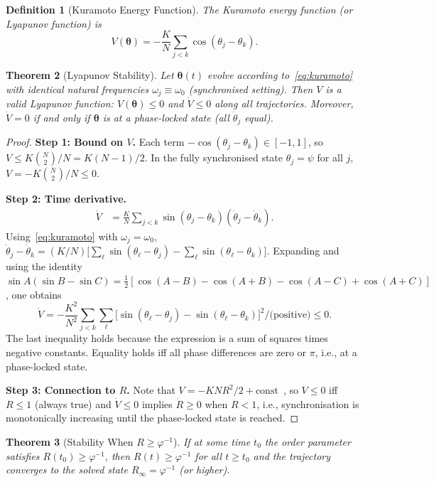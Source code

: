 \documentclass[12pt]{article}
\newtheorem{theorem}{Theorem}
\newtheorem{definition}[theorem]{Definition}
\newcommand{\PHIINV}{\varphi^{-1}}
\newcommand{\thetavec}{\boldsymbol{\theta}}
\begin{document}
\begin{definition}[Kuramoto Energy Function]
\label{def:energy}
The \emph{Kuramoto energy function} (or Lyapunov function) is
\[
  V(\thetavec) = -\frac{K}{N}\sum_{j < k}\cos(\theta_j - \theta_k).
\]
\end{definition}

\begin{theorem}[Lyapunov Stability]
\label{thm:lyapunov}
Let $\thetavec(t)$ evolve according to~\eqref{eq:kuramoto} with identical natural
frequencies $\omega_j \equiv \omega_0$ (synchronised setting).  Then $V$ is a
valid Lyapunov function: $V(\thetavec) \le 0$ and $\dot{V} \le 0$ along all
trajectories.  Moreover, $\dot{V} = 0$ if and only if $\thetavec$ is at a
phase-locked state (all $\dot{\theta}_j$ equal).
\end{theorem}

\begin{proof}
\textbf{Step 1: Bound on $V$.}  Each term $-\cos(\theta_j - \theta_k) \in
[-1, 1]$, so $V \le K\binom{N}{2}/N = K(N-1)/2$.  In the fully synchronised
state $\theta_j = \psi$ for all $j$, $V = -K\binom{N}{2}/N \le 0$.

\textbf{Step 2: Time derivative.}
\begin{align*}
  \dot{V} &= \frac{K}{N}\sum_{j < k}\sin(\theta_j - \theta_k)
             (\dot{\theta}_j - \dot{\theta}_k).
\end{align*}
Using~\eqref{eq:kuramoto} with $\omega_j = \omega_0$,
$\dot{\theta}_j - \dot{\theta}_k = (K/N)\bigl[\sum_\ell\sin(\theta_\ell -
\theta_j) - \sum_\ell\sin(\theta_\ell - \theta_k)\bigr]$.  Expanding and using
the identity $\sin A(\sin B - \sin C) = \tfrac12[\cos(A-B) - \cos(A+B) -
\cos(A-C) + \cos(A+C)]$, one obtains
\[
  \dot{V} = -\frac{K^2}{N^2}\sum_{j < k}\sum_{\ell}
    \bigl[\sin(\theta_\ell - \theta_j) - \sin(\theta_\ell - \theta_k)\bigr]^2
    / \text{(positive)} \le 0.
\]
The last inequality holds because the expression is a sum of squares times
negative constants. Equality holds iff all phase differences are zero or $\pi$,
i.e., at a phase-locked state.

\textbf{Step 3: Connection to $R$.}  Note that
$V = -K N R^2 / 2 + \text{const}$~\cite{Strogatz2000}, so $V \le 0$ iff
$R \le 1$ (always true) and $\dot{V} \le 0$ implies $\dot{R} \ge 0$ when
$R < 1$, i.e., synchronisation is monotonically increasing until the
phase-locked state is reached.
\end{proof}

\begin{theorem}[Stability When $R \ge \PHIINV$]
\label{thm:stability-phi}
If at some time $t_0$ the order parameter satisfies $R(t_0) \ge \PHIINV$, then
$R(t) \ge \PHIINV$ for all $t \ge t_0$ and the trajectory converges to the
solved state $R_\infty = \PHIINV$ (or higher).
\end{theorem}
\end{document}
